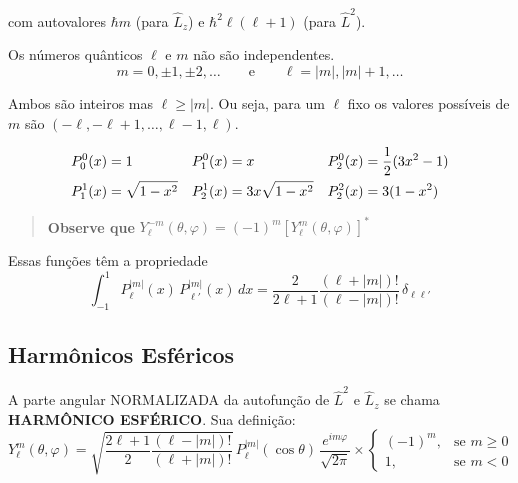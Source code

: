 com autovalores $\hbar m$ (para $\hat{L}_z$) e $\hbar^2 \ell(\ell+1)$ (para $\hat{L}^2$).

Os números quânticos $\ell$ e $m$ não são independentes.
\begin{equation}
    m = 0, \pm1, \pm2, \dots \qquad \text{e} \qquad \ell = |m|, |m|+1, \dots
\label{eq:aula19_quantizacao_lm}
\end{equation}

Ambos são inteiros mas $\ell \geq |m|$. Ou seja, para um $\ell$ fixo os valores possíveis de $m$ são $(-\ell, -\ell+1, \dots, \ell-1, \ell)$.

\begin{align}
    P_0^0(x) &= 1 & P_1^0(x) &= x & P_2^0(x) &= \frac{1}{2}(3x^2-1) \notag \\
    P_1^1(x) &= \sqrt{1-x^2} & P_2^1(x) &= 3x\sqrt{1-x^2} & P_2^2(x) &= 3(1-x^2)
\label{eq:aula19_tabela_legendre}
\end{align}

\begin{quote}
\textbf{Observe que} $Y_\ell^{-m}(\theta,\varphi) = (-1)^m \left[ Y_\ell^m(\theta,\varphi) \right]^*$
\end{quote}

Essas funções têm a propriedade
\begin{equation}
    \boxed{\int_{-1}^{1} P_\ell^{|m|}(x)\, P_{\ell'}^{|m|}(x)\, dx = \frac{2}{2\ell+1}\frac{(\ell+|m|)!}{(\ell-|m|)!}\,\delta_{\ell\ell'}}
\label{eq:aula19_ortogonalidade_legendre}
\end{equation}

\subsection*{Harmônicos Esféricos}

A parte angular NORMALIZADA da autofunção de $\hat{L}^2$ e $\hat{L}_z$ se chama \textbf{HARMÔNICO ESFÉRICO}. Sua definição:
\begin{equation}
    \boxed{Y_\ell^m(\theta,\varphi) = \sqrt{\frac{2\ell+1}{2}\frac{(\ell-|m|)!}{(\ell+|m|)!}} \, P_\ell^{|m|}(\cos\theta) \, \frac{e^{im\varphi}}{\sqrt{2\pi}} \times
    \begin{cases}
        (-1)^m, & \text{se } m \geq 0 \\
        1, & \text{se } m < 0
    \end{cases}}
\label{eq:aula19_harmonico_esferico_def}
\end{equation}

